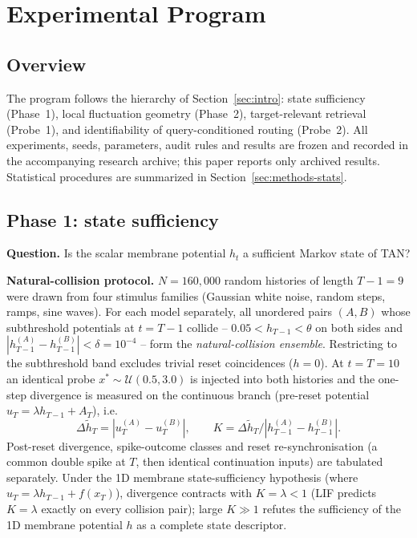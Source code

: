 \section{Experimental Program}\label{sec:methods}

\subsection{Overview}\label{sec:methods-overview}

The program follows the hierarchy of Section~\ref{sec:intro}: state
sufficiency (Phase~1), local fluctuation geometry (Phase~2),
target-relevant retrieval (Probe~1), and identifiability of
query-conditioned routing (Probe~2).  All experiments, seeds,
parameters, audit rules and results are frozen and recorded in the
accompanying research archive; this paper reports only archived results.
Statistical procedures are summarized in
Section~\ref{sec:methods-stats}.

\subsection{Phase 1: state sufficiency}\label{sec:methods-phase1}

\textbf{Question.} Is the scalar membrane potential $h_t$ a sufficient
Markov state of TAN?

\textbf{Natural-collision protocol.} $N = 160{,}000$ random histories of
length $T-1 = 9$ were drawn from four stimulus families (Gaussian white
noise, random steps, ramps, sine waves).  For each model separately, all
unordered pairs $(A,B)$ whose subthreshold potentials at $t = T-1$
collide -- $0.05 < h_{T-1} < \theta$ on both sides and
$|h_{T-1}^{(A)} - h_{T-1}^{(B)}| < \delta = 10^{-4}$ -- form the
\textit{natural-collision ensemble}.  Restricting to the subthreshold
band excludes trivial reset coincidences ($h=0$).  At $t = T = 10$ an
identical probe $x^{*} \sim \mathcal{U}(0.5, 3.0)$ is injected into both
histories and the one-step divergence is measured on the continuous
branch (pre-reset potential $u_{T} = \lambda h_{T-1} + A_T$), i.e.\
\begin{equation}
  \Delta\tilde{h}_T = |u_T^{(A)} - u_T^{(B)}|,
  \qquad K = \Delta\tilde{h}_T / |h_{T-1}^{(A)} - h_{T-1}^{(B)}| .
\end{equation}
Post-reset divergence, spike-outcome classes and reset
re-synchronisation (a common double spike at $T$, then identical
continuation inputs) are tabulated separately.  Under the 1D membrane
state-sufficiency hypothesis (where $u_T = \lambda h_{T-1} + f(x_T)$),
divergence contracts with $K = \lambda < 1$ (LIF predicts $K = \lambda$
exactly on every collision pair); large $K \gg 1$ refutes the sufficiency
of the 1D membrane potential $h$ as a complete state descriptor.

